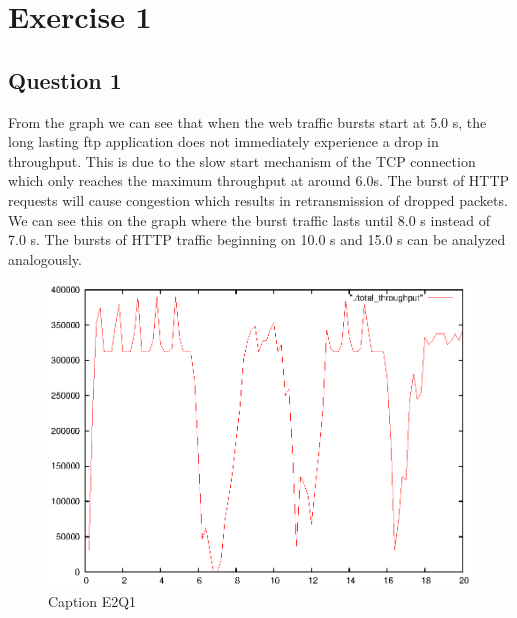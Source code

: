 \documentclass[12pt]{article}
\begin{document}
\section*{Exercise 1}

\subsection*{Question 1}
From the graph we can see that when the web traffic bursts start at 5.0 s, the long lasting ftp application does not immediately experience a drop in throughput. This is due to the slow start mechanism of the TCP connection which only reaches the maximum throughput at around 6.0s. The burst of HTTP requests will cause congestion which results in retransmission of dropped packets. We can see this on the graph where the burst traffic lasts until 8.0 s instead of 7.0 s. The bursts of HTTP traffic beginning on 10.0 s and 15.0 s can be analyzed analogously.
\begin{figure}[h]
\centerline{\includegraphics{pictures/E2Q1.eps}}
\caption{Caption E2Q1}
\label{ex2:question1}
\end{figure}
\end{document}
